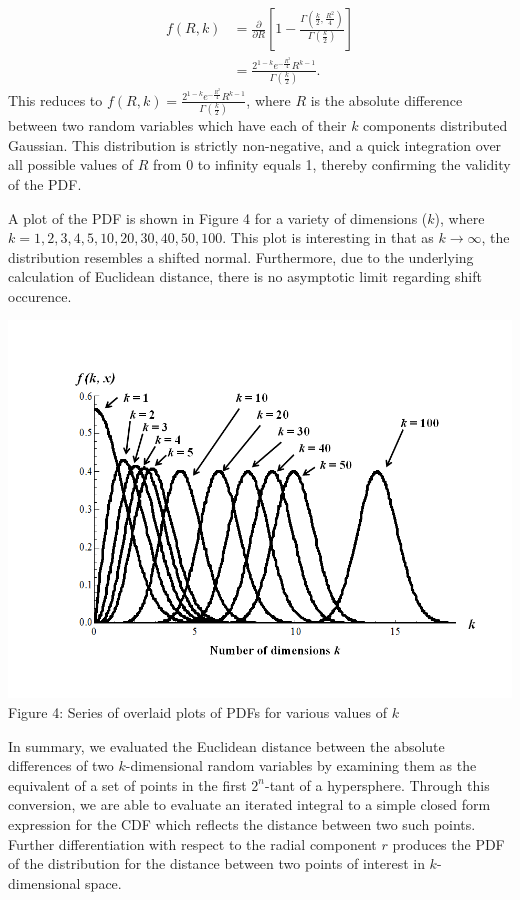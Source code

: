 \documentclass[11pt]{article} %
\begin{document}
\begin{align*}
f(R,k)&=\frac{\partial}{\partial R}\left[1-\frac{\Gamma\left(\frac{k}{2},\frac{R^2}{4}\right)}{\Gamma\left(\frac{k}{2}\right)}\right] \\ 
&= \frac{2^{1-k}e^{-\frac{R^2}{4}}R^{k-1}}{\Gamma\left(\frac{k}{2}\right)}.
\end{align*}
%
\indent This reduces to $f(R, k)  =  \frac{2^{1-k}e^{-\frac{R^2}{4}}R^{k-1}}{\Gamma\left(\frac{k}{2}\right)}$, where $R$ is the absolute difference between two random variables which have each of their $k$ components distributed Gaussian.  This distribution is strictly non-negative, and a quick integration over all possible values of $R$ from 0 to infinity equals 1, thereby confirming the validity of the PDF. 

\indent A plot of the PDF is shown in Figure 4 for a variety of dimensions ($k$), where $k=1, 2, 3, 4, 5, 10, 20, 30, 40, 50, 100$.  This plot is interesting in that as $k \rightarrow \infty$, the distribution resembles a shifted normal.  Furthermore, due to the underlying calculation of Euclidean distance, there is no asymptotic limit regarding shift occurence. \\

\begin{center}
\includegraphics[scale=0.6]{Slide3.png}
Figure 4: Series of overlaid plots of PDFs for various values of $k$
\end{center}



\indent    In summary, we evaluated the Euclidean distance between the absolute differences of two $k$-dimensional random variables by examining them as the equivalent of a set of points in the first $2^n$-tant of a hypersphere.  Through this conversion, we are able to evaluate an iterated integral to a simple closed form expression for the CDF which reflects the distance between two such points.  Further differentiation with respect to the radial component $r$ produces the PDF of the distribution for the distance between two points of interest in $k$-dimensional space.
\end{document}
